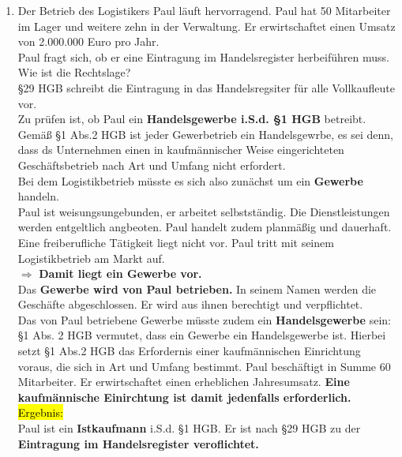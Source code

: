 \documentclass[a4paper, 10pt]{article}
\begin{document}
\begin{enumerate}
        \item Der Betrieb des Logistikers Paul läuft hervorragend. Paul hat 50 Mitarbeiter im Lager und weitere zehn in der Verwaltung. Er erwirtschaftet einen Umsatz von 2.000.000 Euro pro Jahr.\\
        Paul fragt sich, ob er eine Eintragung im Handelsregister herbeiführen muss.\\
        Wie ist die Rechtslage?\\[3mm]
        §29 HGB schreibt die Eintragung in das Handelsregsiter für alle Vollkaufleute vor.\\[2mm]
        Zu prüfen ist, ob Paul ein \textbf{Handelsgewerbe i.S.d. §1 HGB} betreibt.\\[2mm]
        Gemäß §1 Abs.2 HGB ist jeder Gewerbetrieb ein Handelsgewrbe, es sei denn, dass ds Unternehmen einen in kaufmännischer Weise eingerichteten Geschäftsbetrieb nach Art und Umfang nicht erfordert.\\[2mm]
        Bei dem Logistikbetrieb müsste es sich also zunächst um ein \textbf{Gewerbe} handeln.\\
        Paul ist weisungsungebunden, er arbeitet selbstständig. Die Dienstleistungen werden entgeltlich angbeoten. Paul handelt zudem planmäßig und dauerhaft. Eine freiberufliche Tätigkeit liegt nicht vor. Paul tritt mit seinem Logistikbetrieb am Markt auf. \\[2mm]
        $\Longrightarrow$ \textbf{Damit liegt ein Gewerbe vor.} \\[2mm]
        Das \textbf{Gewerbe wird von Paul betrieben.} In seinem Namen werden die Geschäfte abgeschlossen. Er wird aus ihnen berechtigt und verpflichtet. \\[2mm]
        Das von Paul betriebene Gewerbe müsste zudem ein \textbf{Handelsgewerbe} sein:\\[2mm]
        §1 Abs. 2 HGB vermutet, dass ein Gewerbe ein Handelsgewerbe ist. Hierbei setzt §1 Abs.2 HGB das Erfordernis einer kaufmännischen Einrichtung voraus, die sich in Art und Umfang bestimmt. Paul beschäftigt in Summe 60 Mitarbeiter. Er erwirtschaftet einen erheblichen Jahresumsatz. \textbf{Eine kaufmännische Einirchtung ist damit jedenfalls erforderlich.}\\[2.5mm]
        \hl{Ergebnis:}\\
        Paul ist ein \textbf{Istkaufmann} i.S.d. §1 HGB. Er ist nach §29 HGB zu der \textbf{Eintragung im Handelsregister veroflichtet.}

\end{enumerate}
\end{document}
